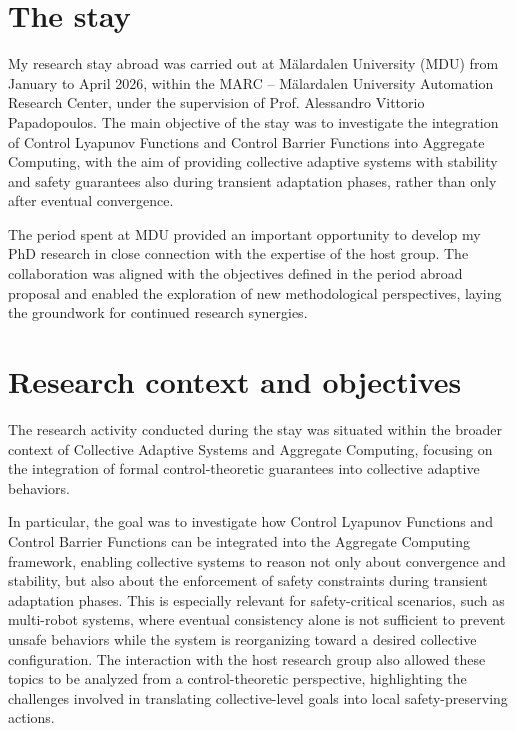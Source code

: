 \documentclass[12pt]{article}
\begin{document}
\section{The stay}
My research stay abroad was carried out at Mälardalen University (MDU)
from January to April 2026,
within the MARC -- Mälardalen University Automation Research Center,
under the supervision of Prof. Alessandro Vittorio Papadopoulos.
%
The main objective of the stay was to investigate the integration of
Control Lyapunov Functions and Control Barrier Functions into Aggregate Computing,
with the aim of providing collective adaptive systems with stability and safety guarantees
also during transient adaptation phases,
rather than only after eventual convergence.

The period spent at MDU provided an important opportunity to develop my PhD research
in close connection with the expertise of the host group.
%
The collaboration was aligned with the objectives defined in the period abroad proposal
and enabled the exploration of new methodological perspectives,
laying the groundwork for continued research synergies.

\section{Research context and objectives}
The research activity conducted during the stay was situated within the broader context
of Collective Adaptive Systems and Aggregate Computing,
focusing on the integration of formal control-theoretic guarantees into collective
adaptive behaviors.

In particular,
the goal was to investigate how Control Lyapunov Functions and Control Barrier Functions
can be integrated into the Aggregate Computing framework,
enabling collective systems to reason not only about convergence and stability,
but also about the enforcement of safety constraints during transient adaptation phases.
%
This is especially relevant for safety-critical scenarios,
such as multi-robot systems,
where eventual consistency alone is not sufficient to prevent unsafe behaviors while
the system is reorganizing toward a desired collective configuration.
%
The interaction with the host research group also allowed these topics to be analyzed
from a control-theoretic perspective,
highlighting the challenges involved in translating collective-level goals into
local safety-preserving actions.
\end{document}
